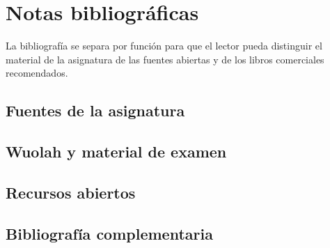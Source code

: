 \chapter{Notas bibliográficas}
La bibliografía se separa por función para que el lector pueda distinguir el material de la asignatura de las fuentes abiertas y de los libros comerciales recomendados.\nocite{*}

\section{Fuentes de la asignatura}
\printbibliography[keyword=course,heading=none]

\section{Wuolah y material de examen}
\printbibliography[keyword=wuolah,heading=none]

\section{Recursos abiertos}
\printbibliography[keyword=open,heading=none]

\section{Bibliografía complementaria}
\printbibliography[keyword=book,heading=none]
